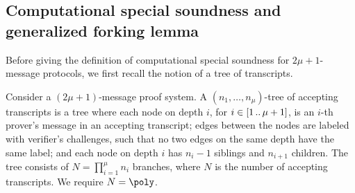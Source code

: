 \subsection{Computational special soundness and generalized forking lemma}

Before giving the definition of computational special soundness for $2\mu + 1$-message protocols, we first recall the notion of a tree of transcripts.
\begin{definition}
	\label{def:tree_of_accepting_transcripts}
	Consider a $(2\mu + 1)$-message proof system. A $(n_1,
  \ldots, n_\mu)$-tree of accepting transcripts is a tree where each node on
  depth $i$, for $i \in [1 \, .. \, \mu + 1]$, is an $i$-th prover's message in an
  accepting transcript; edges between the nodes are labeled with verifier's
  challenges, such that no two edges on the same depth have the same
  label; and each node on depth $i$ has $n_{i} - 1$ siblings and $n_{i +
    1}$ children. The tree consists of $N = \prod_{i = 1}^\mu n_i$
  branches, where $N$ is the number of accepting transcripts. We require $N = \poly$. 
\end{definition}

\iffalse
		
